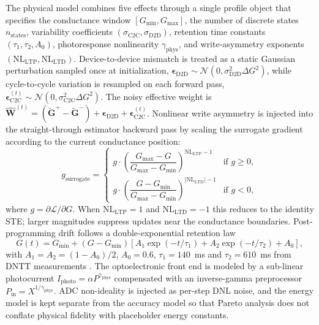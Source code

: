 The physical model combines five effects through a single profile object that specifies the conductance window $[G_{\min}, G_{\max}]$, the number of discrete states $n_{\text{states}}$, variability coefficients $(\sigma_{\text{C2C}}, \sigma_{\text{D2D}})$, retention time constants $(\tau_1, \tau_2, A_0)$, photoresponse nonlinearity $\gamma_{\text{phys}}$, and write-asymmetry exponents $(\mathrm{NL}_{\mathrm{LTP}}, \mathrm{NL}_{\mathrm{LTD}})$. Device-to-device mismatch is treated as a static Gaussian perturbation sampled once at initialization, $\boldsymbol{\epsilon}_{\text{D2D}} \sim \mathcal{N}(0, \sigma_{\text{D2D}}^{2} \Delta G^{2})$, while cycle-to-cycle variation is resampled on each forward pass, $\boldsymbol{\epsilon}_{\text{C2C}}^{(t)} \sim \mathcal{N}(0, \sigma_{\text{C2C}}^{2} \Delta G^{2})$. The noisy effective weight is $\widehat{\mathbf{W}}^{(t)} = (\widetilde{\mathbf{G}}^{+} - \widetilde{\mathbf{G}}^{-}) + \boldsymbol{\epsilon}_{\text{D2D}} + \boldsymbol{\epsilon}_{\text{C2C}}^{(t)}$. Nonlinear write asymmetry is injected into the straight-through estimator backward pass by scaling the surrogate gradient according to the current conductance position:
\begin{equation}
g_{\text{surrogate}} = \begin{cases}
g \cdot \left(\dfrac{G_{\max} - G}{G_{\max} - G_{\min}}\right)^{\mathrm{NL}_{\mathrm{LTP}} - 1} & \text{if } g \ge 0, \\[1.2em]
g \cdot \left(\dfrac{G - G_{\min}}{G_{\max} - G_{\min}}\right)^{|\mathrm{NL}_{\mathrm{LTD}}| - 1} & \text{if } g < 0,
\end{cases}
\label{eq:nl-gradient-scaling}
\end{equation}
where $g = \partial \mathcal{L} / \partial G$. When $\mathrm{NL}_{\mathrm{LTP}} = 1$ and $\mathrm{NL}_{\mathrm{LTD}} = -1$ this reduces to the identity STE; larger magnitudes suppress updates near the conductance boundaries. Post-programming drift follows a double-exponential retention law
\begin{equation}
G(t) = G_{\min} + \left(G - G_{\min}\right) \left[A_1 \exp\left(-t/\tau_1\right) + A_2 \exp\left(-t/\tau_2\right) + A_0\right],
\label{eq:retention}
\end{equation}
with $A_1 = A_2 = (1-A_0)/2$, $A_0 = 0.6$, $\tau_1 = 140$~ms and $\tau_2 = 610$~ms from DNTT measurements \citep{vincze2025dualplasticity}. The optoelectronic front end is modeled by a sub-linear photocurrent $I_{\text{photo}} = \alpha P^{\gamma_{\text{phys}}}$ compensated with an inverse-gamma preprocessor $P_{\text{in}} = X^{1/\gamma_{\text{phys}}}$. ADC non-ideality is injected as per-step DNL noise, and the energy model is kept separate from the accuracy model so that Pareto analysis does not conflate physical fidelity with placeholder energy constants.

